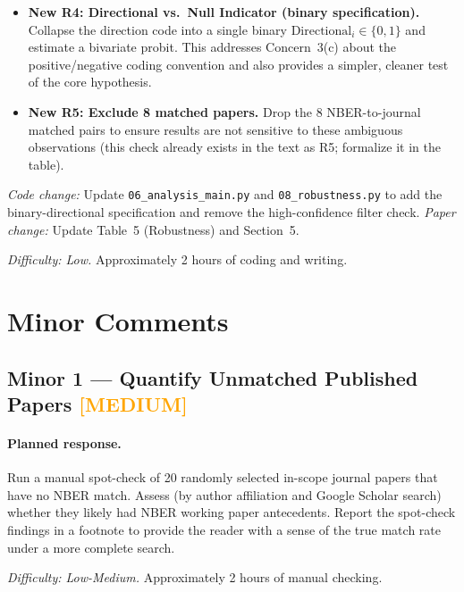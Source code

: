 \documentclass[12pt]{article}
\newcommand{\MED}{\textcolor{orange}{\textbf{[MEDIUM]}}}
\begin{document}
\begin{itemize}
  \item \textbf{New R4: Directional vs.\ Null Indicator (binary specification).}
        Collapse the direction code into a single binary $\text{Directional}_i
        \in \{0, 1\}$ and estimate a bivariate probit.  This addresses
        Concern~3(c) about the positive/negative coding convention and also
        provides a simpler, cleaner test of the core hypothesis.

  \item \textbf{New R5: Exclude 8 matched papers.}  Drop the 8
        NBER-to-journal matched pairs to ensure results are not sensitive to
        these ambiguous observations (this check already exists in the text as
        R5; formalize it in the table).
\end{itemize}

\textit{Code change:} Update \texttt{06\_analysis\_main.py} and
\texttt{08\_robustness.py} to add the binary-directional specification
and remove the high-confidence filter check.
\textit{Paper change:} Update Table~5 (Robustness) and Section~5.

\textit{Difficulty: Low.}  Approximately 2 hours of coding and writing.

\section{Minor Comments}

\subsection{Minor 1 --- Quantify Unmatched Published Papers \MED}

\paragraph{Planned response.}
Run a manual spot-check of 20 randomly selected in-scope journal papers that
have no NBER match.  Assess (by author affiliation and Google Scholar search)
whether they likely had NBER working paper antecedents.  Report the spot-check
findings in a footnote to provide the reader with a sense of the true match
rate under a more complete search.

\textit{Difficulty: Low-Medium.}  Approximately 2 hours of manual checking.
\end{document}

